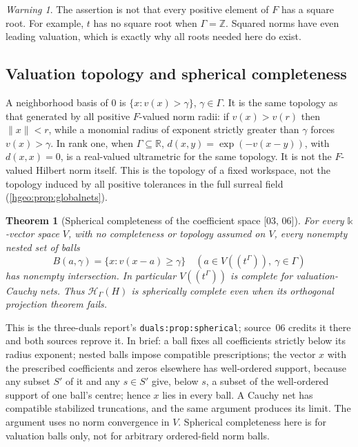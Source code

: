 \documentclass[11pt,letterpaper]{article}
\numberwithin{equation}{section}
\newtheorem{theorem}{Theorem}[section]
\theoremstyle{definition}
\theoremstyle{remark}
\newtheorem{warning}[warning]{Warning}
\newcommand{\R}{\mathbb R}
\newcommand{\Z}{\mathbb Z}
\newcommand{\kk}{\mathbb k}
\newcommand{\F}{F}
\newcommand{\HH}[1]{\mathscr H_\Gamma(#1)}
\newcommand{\norm}[1]{\lVert #1\rVert}
\newcommand{\src}[1]{\textup{\textsf{\small[#1]}}}
\newcommand{\replabel}[1]{\nolinkurl{#1}}
\begin{document}
\begin{warning}\label{hgeo:warn:roots}
The assertion is not that every positive element of $\F$ has a square
root. For example, $t$ has no square root when $\Gamma=\Z$.
Squared norms have even leading valuation, which is exactly why all roots
needed here do exist.
\end{warning}

\subsection{Valuation topology and spherical completeness}
A neighborhood basis of $0$ is $\{x:v(x)>\gamma\}$, $\gamma\in\Gamma$.
It is the same topology as that generated by all positive $\F$-valued norm
radii: if $v(x)>v(r)$ then $\norm{x}<r$, while a monomial radius of exponent
strictly greater than $\gamma$ forces $v(x)>\gamma$. In rank one, when
$\Gamma\subseteq\R$, $d(x,y)=\exp(-v(x-y))$, with $d(x,x)=0$, is a
real-valued ultrametric for the same topology. It is not the $\F$-valued
Hilbert norm itself. This is the topology of a fixed workspace, not the
topology induced by all positive tolerances in the full surreal field
(\cref{hgeo:prop:globalnets}).

\begin{theorem}[Spherical completeness of the coefficient space
\src{03, 06}]\label{hgeo:thm:complete}
For every $\kk$-vector space $V$, with no completeness or topology assumed on
$V$, every nonempty nested set of balls
\[
 B(a,\gamma)=\{x:v(x-a)\ge\gamma\}
       \quad(a\in V((t^\Gamma)),\ \gamma\in\Gamma)
\]
has nonempty intersection. In particular $V((t^\Gamma))$ is complete
for valuation-Cauchy nets. Thus $\HH{H}$ is spherically complete even
when its orthogonal projection theorem fails.
\end{theorem}

This is the three-duals report's \replabel{duals:prop:spherical}; source~06
credits it there and both sources reprove it. In brief: a ball fixes all
coefficients strictly below its radius exponent; nested balls impose
compatible prescriptions; the vector $x$ with the prescribed coefficients and
zeros elsewhere has well-ordered support, because any subset $S'$ of it and
any $s\in S'$ give, below $s$, a subset of the well-ordered support of one
ball's centre; hence $x$ lies in every ball. A Cauchy net has compatible
stabilized truncations, and the same argument produces its limit. The
argument uses no norm convergence in $V$. Spherical completeness here is for
valuation balls only, not for arbitrary ordered-field norm balls.
\end{document}
